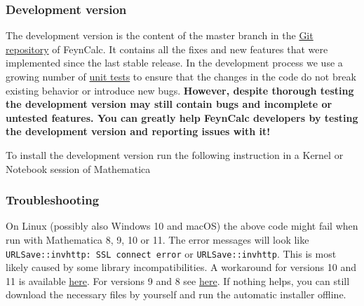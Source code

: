 \documentclass[../FeynCalcManual.tex]{subfiles}
\begin{document}
\hypertarget{development-version}{%
\subsubsection{Development version}\label{development-version}}

The development version is the content of the master branch in the
\href{https://github.com/FeynCalc/feyncalc}{Git repository} of FeynCalc.
It contains all the fixes and new features that were implemented since
the last stable release. In the development process we use a growing
number of
\href{https://github.com/FeynCalc/feyncalc/tree/master/Tests}{unit
tests} to ensure that the changes in the code do not break existing
behavior or introduce new bugs. \textbf{However, despite thorough
testing the development version may still contain bugs and incomplete or
untested features. You can greatly help FeynCalc developers by testing
the development version and reporting issues with it!}

To install the development version run the following instruction in a
Kernel or Notebook session of Mathematica

\begin{Shaded}
\begin{Highlighting}[]
\OperatorTok{[}\OperatorTok{]}
\OperatorTok{[}\OtherTok{{-}\textgreater{}} \OperatorTok{]}
\end{Highlighting}
\end{Shaded}

\hypertarget{troubleshooting}{%
\subsubsection{Troubleshooting}\label{troubleshooting}}

On Linux (possibly also Windows 10 and macOS) the above code might fail
when run with Mathematica 8, 9, 10 or 11. The error messages will look
like \texttt{URLSave::invhttp: SSL connect error} or
\texttt{URLSave::invhttp}. This is most likely caused by some library
incompatibilities. A workaround for versions 10 and 11 is available
\href{https://mathematica.stackexchange.com/questions/212453/urlsave-in-mathematica-10-and-11-on-linux}{here}.
For versions 9 and 8 see
\href{https://mathematica.stackexchange.com/questions/212455/ssl-errors-when-using-urlfetch-or-urlsave-in-versions-8-or-9}{here}.
If nothing helps, you can still download the necessary files by yourself
and run the automatic installer offline.
\end{document}
